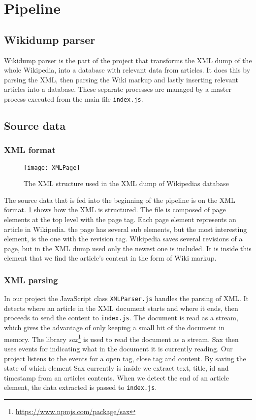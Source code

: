 \section{Pipeline}

\subsection{Wikidump parser}

Wikidump parser is the part of the project that transforms the XML dump of the whole Wikipedia, into a database with relevant data from articles. It does this by parsing the XML, then parsing the Wiki markup and lastly inserting relevant articles into a database. These separate processes are managed by a master process executed from the main file \texttt{index.js}.

\subsection{Source data}


\subsubsection{XML format}
\begin{figure}[h]
\caption{The XML structure used in the XML dump of Wikipedias database}
\texttt{[image: XMLPage]}
\label{fig:xml}
\end{figure}

The source data that is fed into the beginning of the pipeline is on the XML format. \ref{fig:xml} shows how the XML is structured. The file is composed of page elements at the top level with the page tag. Each page element represents an article in Wikipedia. the page has several sub elements, but the most interesting element, is the one with the revision tag. Wikipedia saves several revisions of a page, but in the XML dump used only the newest one is included. It is inside this element that we find the article's content in the form of Wiki markup.


\subsubsection{XML parsing}
In our project the JavaScript class \texttt{XMLParser.js} handles the parsing of XML. It detects where an article in the XML document starts and where it ends, then proceeds to send the content to \texttt{index.js}. The document is read as a stream, which gives the advantage of only keeping a small bit of the document in memory. The library \textit{sax}\footnote{\url{https://www.npmjs.com/package/sax}} is used to read the document as a stream. Sax then uses events for indicating what in the document it is currently reading. Our project listens to the events for a open tag, close tag and content. By saving the state of which element Sax currently is inside we extract text, title, id and timestamp from an articles contents. When we detect the end of an article element, the data extracted is passed to \texttt{index.js}.


